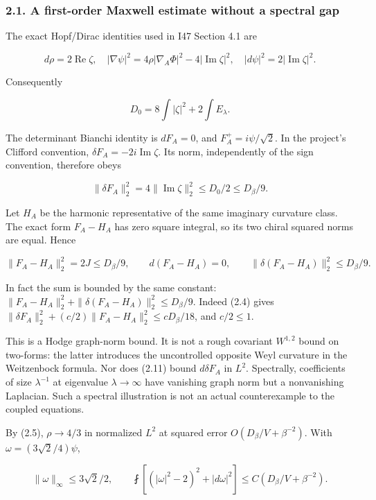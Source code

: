 \documentclass[
  10pt,
]{article}
\begin{document}
\hypertarget{a-first-order-maxwell-estimate-without-a-spectral-gap}{%
\subsubsection{2.1. A first-order Maxwell estimate without a spectral
gap}\label{a-first-order-maxwell-estimate-without-a-spectral-gap}}

The exact Hopf/Dirac identities used in I47 Section 4.1 are

\[
 d\rho=2\operatorname{Re}\zeta,\quad
 |\nabla\psi|^2=4\rho|\nabla_A\Phi|^2
                       -4|\operatorname{Im}\zeta|^2,
 \quad |d\psi|^2=2|\operatorname{Im}\zeta|^2.
\]

Consequently

\[
 D_0=8\int|\zeta|^2+2\int E_\lambda.
 \tag{2.9}
\]

The determinant Bianchi identity is \(dF_A=0\), and
\(F_A^+=i\psi/\sqrt2\). In the project's Clifford convention,
\(\delta F_A=-2i\operatorname{Im}\zeta\). Its norm, independently of the
sign convention, therefore obeys

\[
 \boxed{\|\delta F_A\|_2^2
 =4\|\operatorname{Im}\zeta\|_2^2
 \le D_0/2\le D_\beta/9.}
 \tag{2.10}
\]

Let \(H_A\) be the harmonic representative of the same imaginary
curvature class. The exact form \(F_A-H_A\) has zero square integral, so
its two chiral squared norms are equal. Hence

\[
 \boxed{\|F_A-H_A\|_2^2=2J\le D_\beta/9,\qquad
 d(F_A-H_A)=0,\qquad
 \|\delta(F_A-H_A)\|_2^2\le D_\beta/9.}
 \tag{2.11}
\]

In fact the sum is bounded by the same constant:
\(\|F_A-H_A\|_2^2+\|\delta(F_A-H_A)\|_2^2\le D_\beta/9\). Indeed (2.4)
gives \(\|\delta F_A\|_2^2+(c/2)\|F_A-H_A\|_2^2\le cD_\beta/18\), and
\(c/2\le1\).

This is a Hodge graph-norm bound. It is not a rough covariant
\(W^{1,2}\) bound on two-forms: the latter introduces the uncontrolled
opposite Weyl curvature in the Weitzenbock formula. Nor does (2.11)
bound \(d\delta F_A\) in \(L^2\). Spectrally, coefficients of size
\(\lambda^{-1}\) at eigenvalue \(\lambda\to\infty\) have vanishing graph
norm but a nonvanishing Laplacian. Such a spectral illustration is not
an actual counterexample to the coupled equations.

By (2.5), \(\rho\to4/3\) in normalized \(L^2\) at squared error
\(O(D_\beta/V+\beta^{-2})\). With \(\omega=(3\sqrt2/4)\psi\),

\[
 \|\omega\|_\infty\le3\sqrt2/2,\qquad
 \fint\left[(|\omega|^2-2)^2+|d\omega|^2\right]
       \le C(D_\beta/V+\beta^{-2}).
 \tag{2.12}
\]
\end{document}
